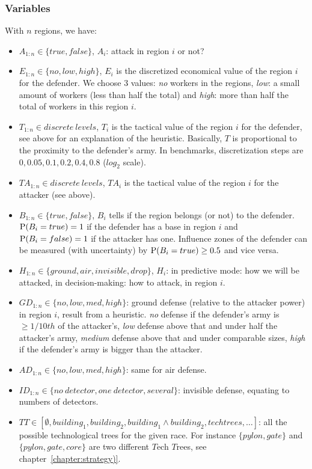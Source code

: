 \subsubsection{Variables}
With $n$ regions, we have: 
\begin{itemize}
    \item $A_{1:n} \in \{true,false\}$, $A_i$: attack in region $i$ or not?
    \item $E_{1:n} \in \{no, low, high\}$, $E_i$ is the discretized economical value of the region $i$ for the defender. We choose 3 values: \textit{no} workers in the regions, \textit{low}: a small amount of workers (less than half the total) and \textit{high}: more than half the total of workers in this region $i$.
    \item $T_{1:n} \in discrete\ levels$, $T_i$ is the tactical value of the region $i$ for the defender, see above for an explanation of the heuristic. Basically, $T$ is proportional to the proximity to the defender's army. In benchmarks, discretization steps are $0,0.05,0.1,0.2,0.4,0.8$ ($log_2$ scale).
    \item $TA_{1:n} \in discrete\ levels$, $TA_i$ is the tactical value of the region $i$ for the attacker (see above).
    \item $B_{1:n} \in \{true, false\}$, $B_i$ tells if the region belongs (or not) to the defender. $\mathrm{P}(B_i=true)=1$ if the defender has a base in region $i$ and $\mathrm{P}(B_i=false)=1$ if the attacker has one. Influence zones of the defender can be measured (with uncertainty) by $\mathrm{P}(B_i=true) \geq 0.5$ and vice versa.
    \item $H_{1:n} \in \{ground, air, invisible, drop\}$, $H_i$: in predictive mode: how we will be attacked, in decision-making: how to attack, in region $i$.
    \item $GD_{1:n} \in \{no, low, med, high\}$: ground defense (relative to the attacker power) in region $i$, result from a heuristic. \textit{no} defense if the defender's army is $\geq 1/10th$ of the attacker's, \textit{low} defense above that and under half the attacker's army, \textit{medium} defense above that and under comparable sizes, \textit{high} if the defender's army is bigger than the attacker.
    \item $AD_{1:n} \in \{no, low, med, high\}$: same for air defense.
    \item $ID_{1:n} \in \{no\ detector, one\ detector, several\}$: invisible defense, equating to numbers of detectors.
    \item $TT \in [\emptyset, building_1, building_2, building_1\wedge building_2, techtrees, \dots]$: all the possible technological trees for the given race. For instance $\{pylon, gate\}$ and $\{pylon, gate, core\}$ are two different $T$ech $T$rees, see chapter~\ref{chapter:strategy)}.

\end{itemize}
